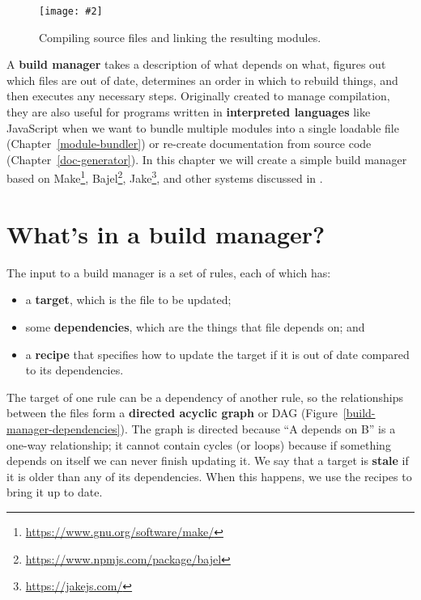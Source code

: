 \documentclass[krantzl]{krantz}
\newcommand{\figpdf}[4]{\begin{figure}%
\centering%
\texttt{[image: \#2]}%
\caption{#3}%
\label{#1}%
\end{figure}}
\newcommand{\chapref}[1]{Chapter~\ref{#1}}
\newcommand{\figref}[1]{Figure~\ref{#1}}
\newcommand{\glossref}[1]{\textbf{#1}}
\newcommand{\hreffoot}[2]{{#1}\footnote{\href{#2}{#2}}}
\begin{document}
\figpdf{build-manager-compiling}{./build-manager/compiling.pdf}{Compiling source files and linking the resulting modules.}{0.6}


A \glossref{build manager} takes a description of what depends on what,
figures out which files are out of date,
determines an order in which to rebuild things,
and then executes any necessary steps.
Originally created to manage compilation,
they are also useful for programs written in \glossref{interpreted languages}
like JavaScript
when we want to bundle multiple modules into a single loadable file (\chapref{module-bundler})
or re-create documentation from source code (\chapref{doc-generator}).
In this chapter we will create a simple build manager
based on \hreffoot{Make}{https://www.gnu.org/software/make/}, \hreffoot{Bajel}{https://www.npmjs.com/package/bajel}, \hreffoot{Jake}{https://jakejs.com/},
and other systems discussed in \cite{Smith2011}.

\section{What’s in a build manager?}\label{build-manager-contents}


The input to a build manager is a set of rules,
each of which has:

\begin{itemize}

\item 

a \glossref{target}, which is the file to be updated;



\item 

some \glossref{dependencies}, which are the things that file depends on;
    and



\item 

a \glossref{recipe} that specifies how to update the target
    if it is out of date compared to its dependencies.



\end{itemize}


\noindent The target of one rule can be a dependency of another rule,
so the relationships between the files form a \glossref{directed acyclic graph} or DAG
(\figref{build-manager-dependencies}).
The graph is directed because “A depends on B” is a one-way relationship;
it cannot contain cycles (or loops) because
if something depends on itself we can never finish updating it.
We say that a target is \glossref{stale} if it is older than any of its dependencies.
When this happens,
we use the recipes to bring it up to date.
\end{document}
